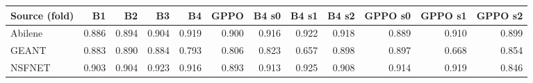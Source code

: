 \begin{tabular}{lrrrrrrrrrrr}
\toprule
Source (fold) & B1 & B2 & B3 & B4 & GPPO & B4 s0 & B4 s1 & B4 s2 & GPPO s0 & GPPO s1 & GPPO s2 \\
\midrule
Abilene & 0.886 & 0.894 & 0.904 & 0.919 & 0.900 & 0.916 & 0.922 & 0.918 & 0.889 & 0.910 & 0.899 \\
GEANT & 0.883 & 0.890 & 0.884 & 0.793 & 0.806 & 0.823 & 0.657 & 0.898 & 0.897 & 0.668 & 0.854 \\
NSFNET & 0.903 & 0.904 & 0.923 & 0.916 & 0.893 & 0.913 & 0.925 & 0.908 & 0.914 & 0.919 & 0.846 \\
\bottomrule
\end{tabular}